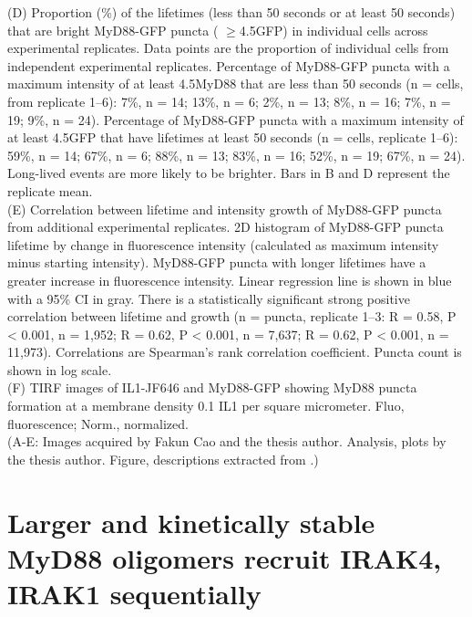 \begin{centering}
{(D) Proportion (\%) of the lifetimes (less than 50 seconds or at least 50 seconds) that are bright MyD88-GFP puncta ( $\geq$4.5\times GFP) in individual cells across experimental replicates. Data points are the proportion of individual cells from independent experimental replicates. Percentage of MyD88-GFP puncta with a maximum intensity of at least 4.5\times MyD88 that are less than 50 seconds (n = cells, from replicate 1--6): 7\%, n = 14; 13\%, n = 6; 2\%, n = 13; 8\%, n = 16; 7\%, n = 19; 9\%, n = 24). Percentage of MyD88-GFP puncta with a maximum intensity of at least 4.5\times GFP that have lifetimes at least 50 seconds (n = cells, replicate 1--6): 59\%, n = 14; 67\%, n = 6; 88\%, n = 13; 83\%, n = 16; 52\%, n = 19; 67\%, n = 24). Long-lived events are more likely to be brighter. Bars in B and D represent the replicate mean.
\vspace{1em}
\\
(E) Correlation between lifetime and intensity growth of MyD88-GFP puncta from additional experimental replicates. 2D histogram of MyD88-GFP puncta lifetime by change in fluorescence intensity (calculated as maximum intensity minus starting intensity). MyD88-GFP puncta with longer lifetimes have a greater increase in fluorescence intensity. Linear regression line is shown in blue with a 95\% CI in gray. There is a statistically significant strong positive correlation between lifetime and growth (n = puncta, replicate 1--3: R = 0.58, P < 0.001, n = 1,952; R = 0.62, P < 0.001, n = 7,637; R = 0.62, P < 0.001, n = 11,973). Correlations are Spearman’s rank correlation coefficient. Puncta count is shown in log scale.
\vspace{1em}
\\
(F) TIRF images of IL1{\textbeta}-JF646 and MyD88-GFP showing MyD88 puncta formation at a membrane density 0.1 IL1{\textbeta} per square micrometer. Fluo, fluorescence; Norm., normalized.
\vspace{1em}
\\
(A-E: Images acquired by Fakun Cao and the thesis author. Analysis, plots by the thesis author. Figure, descriptions extracted from \autocite{Deliz-Aguirre_2021}.)}
\label{p1:S3}
\end{centering}

\section{Larger and kinetically stable MyD88 oligomers recruit IRAK4, IRAK1 sequentially}
\label{section:supplement_IRAK_recruitment}

